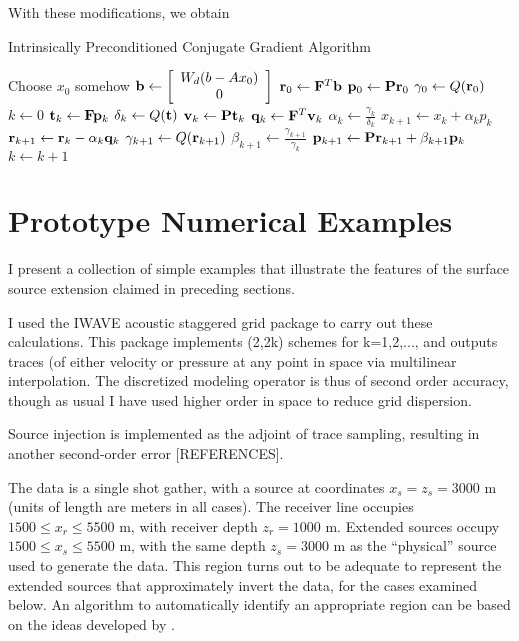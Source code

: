 With these modifications, we obtain 
\begin{algorithm}[H]
\caption{Intrinsically Preconditioned Conjugate Gradient Algorithm}
\begin{algorithmic}[1]
\State Choose $x_0$ somehow
\State ${\bf b} \gets \left[
\begin{array}{c}
W_d(b-Ax_0)\\
0
\end{array}
\right]$
  \State ${\bf r}_0 \gets {\bf F}^T{\bf b}$
  \State ${\bf p}_0 \gets {\bf P}{\bf r}_0$
  \State $\gamma_0 \gets Q({\bf r}_0)$
  \State $k \gets 0$
  \Repeat
  \State ${\bf t}_k \gets {\bf F}{\bf p}_k$
  \State $\delta_k \gets Q({\bf t})$
  \State ${\bf v}_k \gets {\bf P}{\bf t}_k$
  \State ${\bf q}_k \gets {\bf F}^T{\bf v}_k$
  \State $\alpha_k \gets \frac{\gamma_k}{\delta_k}$
  \State $x_{k+1} \gets x_k + \alpha_k p_k$
  \State ${\bf r}_{k+1} \gets {\bf r}_k - \alpha_k{\bf q}_k$
  \State $\gamma_{k+1} \gets Q({\bf r}_{k+1})$
  \State $\beta_{k+1} \gets \frac{\gamma_{k+1}}{\gamma_k}$
  \State ${\bf p}_{k+1}\gets {\bf P}{\bf r}_{k+1}+\beta_{k+1}{\bf p}_k$
  \State $k \gets k+1$
\end{algorithmic}
\end{algorithm}


\section{Prototype Numerical Examples}

I present a collection of simple examples that illustrate the features of the surface source extension claimed in preceding sections. 

I used the IWAVE acoustic staggered grid package to carry out these calculations. This package implements (2,2k) schemes for k=1,2,..., and outputs traces (of either velocity or pressure at any point in space via multilinear interpolation. The discretized modeling operator is thus of second order accuracy, though as usual I have used higher order in space to reduce grid dispersion.

Source injection is implemented as the adjoint of trace sampling, resulting in another second-order error [REFERENCES]. 

The data is a single shot gather, with a source at coordinates $x_s=z_s=3000$ m (units of length are meters in all cases). The receiver line occupies $1500 \le x_r \le 5500$ m, with receiver depth $z_r=1000$ m.  Extended sources occupy $1500 \le x_s \le 5500$ m, with the same depth $z_s=3000$ m as the ``physical'' source used to generate the data. This region turns out to be adequate to represent the extended sources that approximately invert the data, for the cases examined below. An algorithm to automatically identify an appropriate region can be based on the ideas developed by \cite{Fu:Geo17}.

